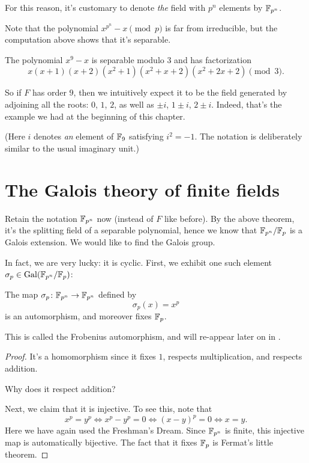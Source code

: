 \begin{definition}
	For this reason, it's customary to denote \emph{the}
	field with $p^n$ elements by $\mathbb F_{p^n}$.
\end{definition}

Note that the polynomial $x^{p^n}-x \pmod p$ is far from irreducible, but
the computation above shows that it's separable.
\begin{example}
	The polynomial $x^9-x$ is separable modulo $3$ and has factorization
	\[ x(x+1)(x+2)(x^2+1)(x^2+x+2)(x^2+2x+2) \pmod 3. \]

	So if $F$ has order $9$, then we intuitively expect it to be the field
	generated by adjoining all the roots: $0$, $1$, $2$, as well as
	$\pm i$, $1 \pm i$, $2 \pm i$.
	Indeed, that's the example we had at the beginning of this chapter.

	(Here $i$ denotes \emph{an} element of $\mathbb F_9$ satisfying $i^2=-1$.
	The notation is deliberately similar to the usual imaginary unit.)
\end{example}

\section{The Galois theory of finite fields}
Retain the notation $\mathbb F_{p^n}$ now (instead of $F$ like before).
By the above theorem, it's the splitting field of a separable polynomial,
hence we know that $\mathbb F_{p^n} /\mathbb F_p$ is a Galois extension.
We would like to find the Galois group.

In fact, we are very lucky: it is cyclic.
First, we exhibit one such element $\sigma_p \in \operatorname{Gal}(\mathbb F_{p^n} /\mathbb F_p)$:

\begin{theorem}
	The map $\sigma_p \colon \mathbb F_{p^n} \to \mathbb F_{p^n}$ defined by
	\[ \sigma_p(x) = x^p \]
	is an automorphism, and moreover fixes $\mathbb F_p$.
\end{theorem}
This is called the Frobenius automorphism, and will re-appear later on in .
\begin{proof}
	It's a homomorphism since it fixes $1$,
	respects multiplication,
	and respects addition.
	\begin{ques}
		Why does it respect addition?
	\end{ques}
	Next, we claim that it is injective. To see this, note that
	\[ x^p = y^p
		\iff x^p - y^p = 0
		\iff (x-y)^p = 0
		\iff x=y.
	\]
	Here we have again used the Freshman's Dream.
	Since $\mathbb F_{p^n}$ is finite, this injective map is automatically bijective.
	The fact that it fixes $\mathbb F_p$ is Fermat's little theorem.
\end{proof}

